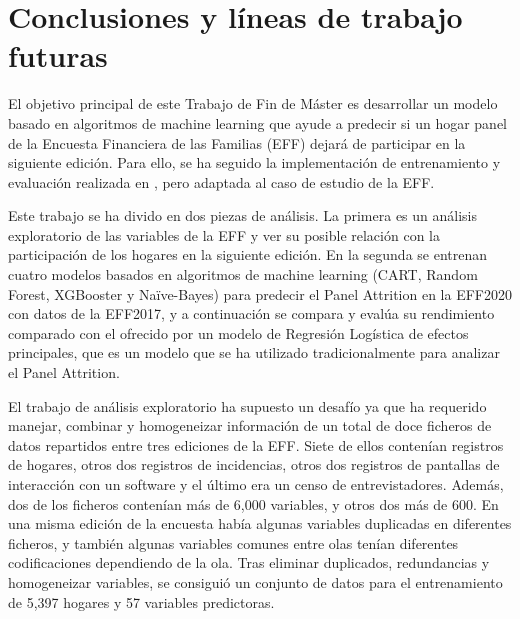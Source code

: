\chapter{Conclusiones y líneas de trabajo futuras}
\label{chapter:conclusiones}

El objetivo principal de este Trabajo de Fin de Máster es desarrollar un modelo basado en algoritmos de machine learning que ayude a predecir si un hogar panel de la Encuesta Financiera de las Familias (EFF) dejará de participar en la siguiente edición. Para ello, se ha seguido la implementación de entrenamiento y evaluación realizada en \cite{beste2023case}, pero adaptada al caso de estudio de la EFF.

Este trabajo se ha divido en dos piezas de análisis. La primera es un análisis exploratorio de las variables de la EFF y ver su posible relación con la participación de los hogares en la siguiente edición. En la segunda se entrenan cuatro modelos basados en algoritmos de machine learning (CART, Random Forest, XGBooster y Naïve-Bayes) para predecir el Panel Attrition en la EFF2020 con datos de la EFF2017, y a continuación se compara y evalúa su rendimiento comparado con el ofrecido por un modelo de Regresión Logística de efectos principales, que es un modelo que se ha utilizado tradicionalmente para analizar el Panel Attrition.

El trabajo de análisis exploratorio ha supuesto un desafío ya que ha requerido manejar, combinar y homogeneizar información de un total de doce ficheros de datos repartidos entre tres ediciones de la EFF. Siete de ellos contenían registros de hogares, otros dos registros de incidencias, otros dos registros de pantallas de interacción con un software y el último era un censo de entrevistadores. Además, dos de los ficheros contenían más de 6,000 variables, y otros dos más de 600. En una misma edición de la encuesta había algunas variables duplicadas en diferentes ficheros, y también algunas variables comunes entre olas tenían diferentes codificaciones dependiendo de la ola. Tras eliminar duplicados, redundancias y homogeneizar variables, se consiguió un conjunto de datos para el entrenamiento de 5,397 hogares y 57 variables predictoras.

